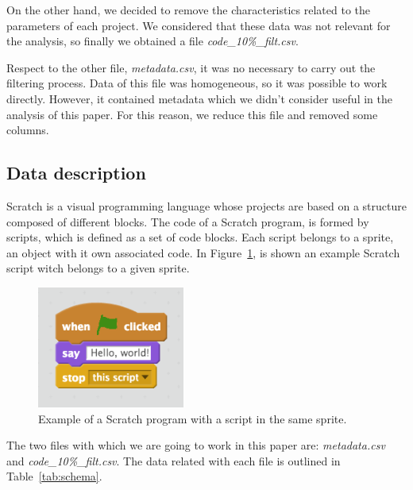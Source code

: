 \documentclass[a4paper,twocolumn,10pt]{article}
\begin{document}
On the other hand, we decided to remove the characteristics related to the
parameters of each project. We considered that these data was not relevant
for the analysis, so finally we obtained a file
\textit{code\_10\%\_filt.csv}.

Respect to the other file, \textit{metadata.csv}, it was no necessary to carry
out the filtering process. Data of this file was homogeneous, so it was
possible to work directly. However, it contained metadata which we didn't
consider useful in the analysis of this paper. For this reason, we reduce
this file and removed some columns.

\subsection{Data description}
\label{subsec:description}

Scratch is a visual programming language whose projects are based on a structure
composed of different blocks. The code of a Scratch program, is formed by scripts,
which is defined as a set of code blocks. Each script belongs to a sprite, an object
with it own associated code. In Figure~\ref{tab:scratch}, is shown an example
Scratch script witch belongs to a given sprite.

\begin{figure}
\begin{center}
\includegraphics[height=4cm]{images/scratch.png}
\caption{Example of a Scratch program with a script in the same sprite.}
\label{tab:scratch}
\end{center}
\end{figure}

The two files with which we are going to work in this paper are:
\textit{metadata.csv} and \textit{code\_10\%\_filt.csv}. 
The data related with each file is outlined in Table~\ref{tab:schema}.
\end{document}
